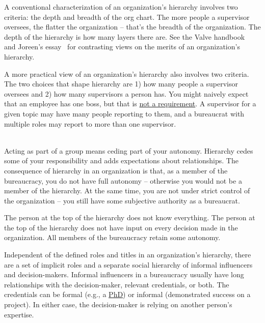 A conventional characterization of an organization's hierarchy involves two criteria: the depth and breadth of the \gls{org chart}.
The more people a supervisor oversees, the flatter the organization -- that's the breadth of the organization. The depth of the hierarchy is how many layers there are. See the Valve handbook~\cite{2012_Valve} and Joreen's essay~\cite{1972_Joreen} for contrasting views on the merits of an organization's hierarchy. 

A more practical view of an organization's hierarchy also involves two criteria. The two choices that shape hierarchy are 
1) how many people a supervisor oversees and 
2) how many supervisors a person has. 
You might naively expect that an employee has one boss, but that is \href{https://en.wikipedia.org/wiki/Matrix_management}{not a requirement}. 
\iftoggle{WPinmargin}{\marginpar{$>$Wikipedia: Matrix management}}{}
A supervisor for a given topic may have many people reporting to them, and a bureaucrat with multiple roles may report to more than one supervisor.

\ \\

Acting as part of a group means ceding part of your autonomy. Hierarchy cedes some of your responsibility and adds expectations about relationships.
The consequence of hierarchy in an organization is that, as a member of the bureaucracy, you do not have full autonomy -- otherwise you would not be a member of the hierarchy. At the same time, you are not under strict control of the organization -- you still have some subjective %
authority as a bureaucrat.

The person at the top of the hierarchy does not know everything. The person at the top of the hierarchy does not have input on every decision made in the organization. All members of the bureaucracy retain some autonomy.

Independent of the defined roles and titles in an organization's hierarchy, there are a set of implicit roles and a separate social hierarchy of informal influencers and decision-makers. Informal influencers in a bureaucracy usually have long relationships with the decision-maker, relevant credentials, or both. The credentials can be formal (e.g., a \href{https://en.wikipedia.org/wiki/Doctor_of_Philosophy}{PhD}) 
\iftoggle{WPinmargin}{\marginpar{$>$Wikipedia: Doctor of Philosophy}}{}
or informal (demonstrated success on a project). In either case, the decision-maker is relying on another person's expertise. 

